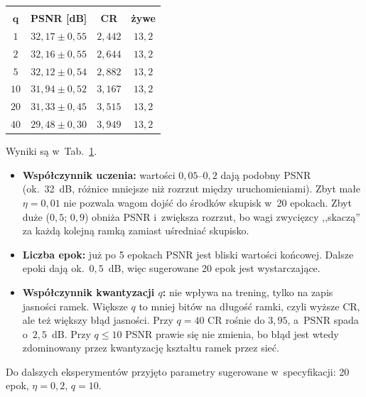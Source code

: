 \documentclass[12pt]{article}
\begin{document}
\begin{table}[h!]
 \vspace{0.3cm}
 \begin{tabular}{c c c c}
  \hline\hline\\[-0.4cm]
  $\boldsymbol{q}$ & \textbf{PSNR [dB]} & \textbf{CR} & \textbf{żywe}\\[0.1cm]
  \hline
  $1$ & $32{,}17\pm0{,}55$ & $2{,}442$ & $13{,}2$ \\
  $2$ & $32{,}16\pm0{,}55$ & $2{,}644$ & $13{,}2$ \\
  $5$ & $32{,}12\pm0{,}54$ & $2{,}882$ & $13{,}2$ \\
  $10$ & $31{,}94\pm0{,}52$ & $3{,}167$ & $13{,}2$ \\
  $20$ & $31{,}33\pm0{,}45$ & $3{,}515$ & $13{,}2$ \\
  $40$ & $29{,}48\pm0{,}30$ & $3{,}949$ & $13{,}2$ \\
  \hline
 \end{tabular}
 \label{tab_param}
\end{table}

\noindent Wyniki są w~Tab.~\ref{tab_param}.
\begin{itemize}
 \item \textbf{Współczynnik uczenia:} wartości $0{,}05$--$0{,}2$ dają podobny PSNR (ok.\ 32~dB,
       różnice mniejsze niż rozrzut między uruchomieniami). Zbyt małe $\eta=0{,}01$ nie pozwala wagom
       dojść do środków skupisk w~20 epokach. Zbyt duże ($0{,}5$; $0{,}9$) obniża PSNR i~zwiększa rozrzut,
       bo wagi zwycięzcy ,,skaczą'' za każdą kolejną ramką zamiast uśredniać skupisko.
 \item \textbf{Liczba epok:} już po 5 epokach PSNR jest bliski wartości końcowej. Dalsze epoki dają
       ok.\ $0{,}5$~dB, więc sugerowane 20 epok jest wystarczające.
 \item \textbf{Współczynnik kwantyzacji $q$:} nie wpływa na trening, tylko na zapis jasności ramek.
       Większe $q$ to mniej bitów na długość ramki, czyli wyższe CR, ale też większy błąd jasności.
       Przy $q=40$ CR rośnie do $3{,}95$, a~PSNR spada o~$2{,}5$~dB. Przy $q\le10$ PSNR prawie się
       nie zmienia, bo błąd jest wtedy zdominowany przez kwantyzację kształtu ramek przez sieć.
\end{itemize}
Do dalszych eksperymentów przyjęto parametry sugerowane w~specyfikacji: 20 epok, $\eta=0{,}2$, $q=10$.

\end{document}
